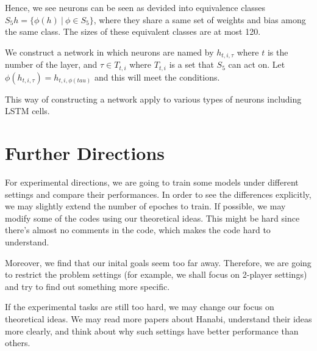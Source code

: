 \documentclass[12pt]{article}
\begin{document}
  Hence, we see neurons can be seen as devided into equivalence classes $S_5h = \{\phi(h)~|~\phi\in S_5\}$, where they share a same set of weights and bias among the same class. The sizes of these equivalent classes are at most 120.

  We construct a network in which neurons are named by $h_{t,i,\tau}$ where $t$ is the number of the layer, and $\tau\in T_{t,i}$ where $T_{t,i}$ is a set that $S_5$ can act on. Let $\phi(h_{t,i,\tau})=h_{t,i,\phi(tau)}$ and this will meet the conditions.

  This way of constructing a network apply to various types of neurons including LSTM cells.

\section{Further Directions}
For experimental directions, we are going to train some models under different settings and compare their performances. In order to see the differences explicitly, we may slightly extend the number of epoches to train. If possible, we may modify some of the codes using our theoretical ideas. This might be hard since there's almost no comments in the code, which makes the code hard to understand.

Moreover, we find that our inital goals seem too far away. Therefore, we are going to restrict the problem settings (for example, we shall focus on 2-player settings) and try to find out something more specific.

If the experimental tasks are still too hard, we may change our focus on theoretical ideas. We may read more papers about Hanabi, understand their ideas more clearly, and think about why such settings have better performance than others.

\normalem


\end{document}
